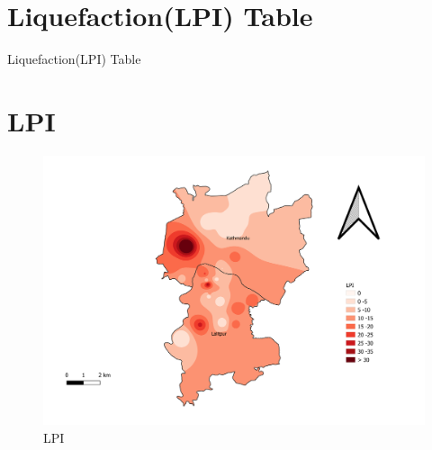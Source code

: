 \section{Liquefaction(LPI) Table}
\begin{table}[!h]
\caption{Liquefaction(LPI) Table}

\end{table}
\pagebreak

\section{LPI}
\begin{figure}[!hbt]
\centering
\includegraphics[width=\linewidth, height=\textheight,keepaspectratio]{in/map/lqi2.png}
\caption{LPI}
\end{figure}
\pagebreak